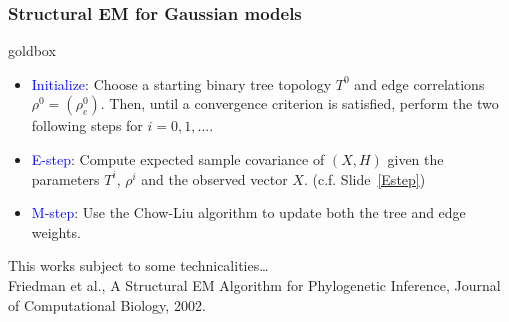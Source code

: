 \documentclass[dvipsnames,aspectratio=169]{beamer} %
\begin{document}
\begin{frame}
	\frametitle{Structural EM for Gaussian models}
\begin{beamercolorbox}[wd=\paperwidth,sep=5pt]{goldbox}
\begin{itemize}
\item \textcolor{blue}{Initialize}: Choose a starting binary tree topology $T^0$ and edge correlations $\rho^{0}=(\rho^0_{e})$. Then, until a convergence criterion is satisfied, perform the two following steps for $i=0,1,...$.
\item \textcolor{blue}{E-step}: Compute expected sample covariance of $(X,H)$ given the parameters $T^i$, $\rho^i$ and the observed vector $X$. (c.f. Slide~\ref{Estep}) 
\item \textcolor{blue}{M-step}: Use the Chow-Liu algorithm to update both the tree and edge weights.
\end{itemize}
\end{beamercolorbox}
\vspace{.5cm}
This works subject to some technicalities\ldots\\
{\tiny Friedman et al., A Structural EM Algorithm for Phylogenetic Inference, Journal of Computational Biology, 2002.
}
\end{frame}
\note[itemize]{\item 
}


%
\end{document}
